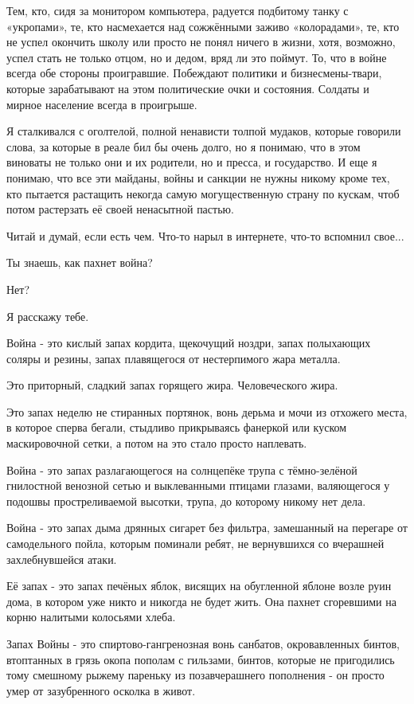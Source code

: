 Тем, кто, сидя за монитором компьютера, радуется подбитому танку с «укропами»,
те, кто насмехается над сожжёнными заживо «колорадами», те, кто не успел
окончить школу или просто не понял ничего в жизни, хотя, возможно, успел стать
не только отцом, но и дедом, вряд ли это поймут. То, что в войне всегда обе
стороны проигравшие. Побеждают политики и бизнесмены-твари, которые
зарабатывают на этом политические очки и состояния. Солдаты и мирное население
всегда в проигрыше.

Я сталкивался с оголтелой, полной ненависти толпой мудаков, которые говорили
слова, за которые в реале бил бы очень долго, но я понимаю, что в этом виноваты
не только они и их родители, но и пресса, и государство. И еще я понимаю, что
все эти майданы, войны и санкции не нужны никому кроме тех, кто пытается
растащить некогда самую могущественную страну по кускам, чтоб потом растерзать
её своей ненасытной пастью.

Читай и думай, если есть чем. Что-то нарыл в интернете, что-то вспомнил свое...

Ты знаешь, как пахнет война?

Нет?

Я расскажу тебе.

Война - это кислый запах кордита, щекочущий ноздри, запах полыхающих соляры и
резины, запах плавящегося от нестерпимого жара металла.

Это приторный, сладкий запах горящего жира. Человеческого жира.

Это запах неделю не стиранных портянок, вонь дерьма и мочи из отхожего места, в
которое сперва бегали, стыдливо прикрываясь фанеркой или куском маскировочной
сетки, а потом на это стало просто наплевать.

Война - это запах разлагающегося на солнцепёке трупа с тёмно-зелёной гнилостной
венозной сетью и выклеванными птицами глазами, валяющегося у подошвы
простреливаемой высотки, трупа, до которому никому нет дела.

Война - это запах дыма дрянных сигарет без фильтра, замешанный на перегаре от
самодельного пойла, которым поминали ребят, не вернувшихся со вчерашней
захлебнувшейся атаки.

Её запах - это запах печёных яблок, висящих на обугленной яблоне возле руин
дома, в котором уже никто и никогда не будет жить. Она пахнет сгоревшими на
корню налитыми колосьями хлеба.

Запах Войны - это спиртово-гангренозная вонь санбатов, окровавленных бинтов,
втоптанных в грязь окопа пополам с гильзами, бинтов, которые не пригодились
тому смешному рыжему пареньку из позавчерашнего пополнения - он просто умер от
зазубренного осколка в живот.

